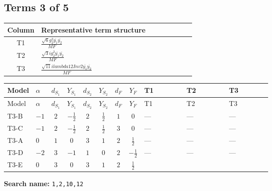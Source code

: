 \documentclass[8pt]{article}
\begin{document}
\begin{landscape}
\subsection*{Terms 3 of 5}
\begin{center}
\begin{tabular}{@{}c >{\raggedright\arraybackslash}p{0.82\linewidth}@{}}
\toprule
Column & Representative term structure \\
\midrule
T1 & \(\displaystyle \frac{\sqrt{6} g_{2}^{2} \overline{y_{1}} \overline{y_{2}}}{MF}\) \\
\midrule
T2 & \(\displaystyle \frac{\sqrt{3} i g_{2}^{2} \overline{y_{1}} \overline{y_{2}}}{MF}\) \\
\midrule
T3 & \(\displaystyle \frac{\sqrt{11} i lambda12Inv2 \overline{y_{1}} \overline{y_{2}}}{MF}\) \\
\midrule
\bottomrule
\end{tabular}
\end{center}
\smallskip
\tiny
\begin{longtable}{@{}llcccccc >{\raggedright\arraybackslash}p{0.21\linewidth} >{\raggedright\arraybackslash}p{0.21\linewidth} >{\raggedright\arraybackslash}p{0.21\linewidth}@{}}
\toprule
Model & $\alpha$ & $d_{S_1}$ & $Y_{S_1}$ & $d_{S_2}$ & $Y_{S_2}$ & $d_F$ & $Y_F$ & T1 & T2 & T3 \\
\midrule
\endfirsthead
\toprule
Model & $\alpha$ & $d_{S_1}$ & $Y_{S_1}$ & $d_{S_2}$ & $Y_{S_2}$ & $d_F$ & $Y_F$ & T1 & T2 & T3 \\
\midrule
\endhead
T3-B & $-1$ & $2$ & $-\frac{1}{2}$ & $2$ & $\frac{1}{2}$ & $1$ & $0$ & --- & --- & --- \\
\midrule
T3-C & $-1$ & $2$ & $-\frac{1}{2}$ & $2$ & $\frac{1}{2}$ & $3$ & $0$ & --- & --- & --- \\
\midrule
T3-A & $0$ & $1$ & $0$ & $3$ & $1$ & $2$ & $\frac{1}{2}$ & --- & --- & --- \\
\midrule
T3-D & $-2$ & $3$ & $-1$ & $1$ & $0$ & $2$ & $-\frac{1}{2}$ & --- & --- & --- \\
\midrule
T3-E & $0$ & $3$ & $0$ & $3$ & $1$ & $2$ & $\frac{1}{2}$ & \scriptsize\adjustbox{max width=\linewidth}{$\begin{gathered} - \frac{\sqrt{6} g_{2}^{2} \overline{y_{1}} \overline{y_{2}}}{6 MF}\end{gathered}$} & \scriptsize\adjustbox{max width=\linewidth}{$\begin{gathered} - \frac{15 \sqrt{3} i g_{2}^{2} \overline{y_{1}} \overline{y_{2}}}{8 MF}\end{gathered}$} & \scriptsize\adjustbox{max width=\linewidth}{$\begin{gathered} - \frac{3 \sqrt{11} i lambda12Inv2 \overline{y_{1}} \overline{y_{2}}}{22 MF}\end{gathered}$} \\
\midrule
\bottomrule
\end{longtable}
\clearpage
\noindent\textbf{Search name: }\texttt{1,2,10,12}\par\smallskip

\end{landscape}
\end{document}
